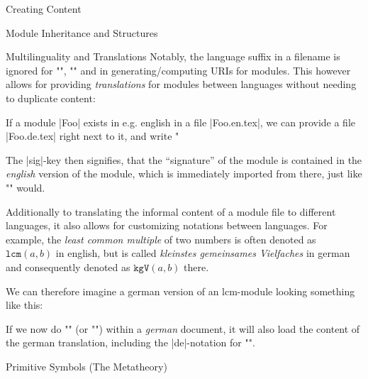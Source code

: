 \begin{sfragment}{Creating \sTeX Content}
\begin{sfragment}{Module Inheritance and Structures}
\begin{sfragment}{Multilinguality and Translations}
      Notably, the language suffix in a filename is ignored
      for \stexcode"\usemodule", \stexcode"\importmodule"
      and in generating/computing URIs for modules. This however
      allows for providing \emph{translations} for modules
      between languages without needing to duplicate content:

      If a module |Foo| exists in e.g. english in a file |Foo.en.tex|,
      we can provide a file |Foo.de.tex| right next to it, and write
      \stexcode"\fi
      The |sig|-key then signifies, that the ``signature'' of the
      module is contained in the \emph{english} version of the module,
      which is immediately imported from there, just like
      \stexcode"\importmodule" would.

      Additionally to translating the informal content of a module
      file to different languages, it also allows for customizing
      notations between languages. For example,
      the \emph{least common multiple} of two numbers is often
      denoted as $\mathtt{lcm}(a,b)$ in english, but is
      called \emph{kleinstes gemeinsames Vielfaches} in german
      and consequently denoted as $\mathtt{kgV}(a,b)$ there.

      We can therefore imagine a german version of an lcm-module
      looking something like this:

      \begin{latexcode}[gobble=8]
      \end{latexcode}

      If we now do \stexcode""
      (or \stexcode"") within a \emph{german} document,
      it will also load the content of the german translation,
      including the |de|-notation for \stexcode"\lcm".

    \end{sfragment}

    
    
  \end{sfragment}

  \begin{sfragment}{Primitive Symbols (The \sTeX Metatheory)}
    
  \end{sfragment}
  
\end{sfragment}

